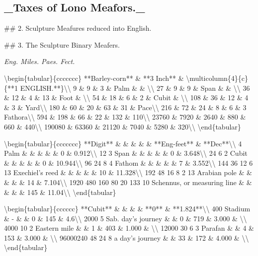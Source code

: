 \subsection*{\_Taxes of Lono Meafors.\_}
\#\# 2. Sculpture Meafures reduced into English.\par\medskip
\#\# 3. The Sculpture Binary Meafers.\par\medskip
{\small\itshape Eng. Miles. Paes. Fect.\par}\medskip
\textbackslash{}begin\{tabular\}\{ccccccc\}
**Barley-corn** \& **3 Inch** \& \textbackslash{}multicolumn\{4\}\{c\}\{**1 ENGLISH.**\}\textbackslash{}\textbackslash{}
9 \& 9 \& 3 \& Palm \& \& \textbackslash{}\textbackslash{}
27 \& 9 \& 9 \& Span \& \& \textbackslash{}\textbackslash{}
36 \& 12 \& 4 \& 13 \& Foot \& \textbackslash{}\textbackslash{}
54 \& 18 \& 6 \& 2 \& Cubit \& \textbackslash{}\textbackslash{}
108 \& 36 \& 12 \& 4 \& 3 \& Yard\textbackslash{}\textbackslash{}
180 \& 60 \& 20 \& 63 \& 31 \& Pace\textbackslash{}\textbackslash{}
216 \& 72 \& 24 \& 8 \& 6 \& 3 Fathora\textbackslash{}\textbackslash{}
594 \& 198 \& 66 \& 22 \& 132 \& 110\textbackslash{}\textbackslash{}
23760 \& 7920 \& 2640 \& 880 \& 660 \& 440\textbackslash{}\textbackslash{}
190080 \& 63360 \& 21120 \& 7040 \& 5280 \& 320\textbackslash{}\textbackslash{}
\textbackslash{}end\{tabular\}\par\medskip
\textbackslash{}begin\{tabular\}\{ccccccc\}
**Digit** \& \& \& \& \& **Eng-feet** \& **Dec**\textbackslash{}\textbackslash{}
4 Palm \& \& \& \& \& 0 \& 0.912\textbackslash{}\textbackslash{}
12 3 Span \& \& \& \& \& 0 \& 3.648\textbackslash{}\textbackslash{}
24 6 2 Cubit \& \& \& \& \& 0 \& 10.944\textbackslash{}\textbackslash{}
96 24 8 4 Fathom \& \& \& \& \& 7 \& 3.552\textbackslash{}\textbackslash{}
144 36 12 6 13 Exechiel's reed \& \& \& \& \& 10 \& 11.328\textbackslash{}\textbackslash{}
192 48 16 8 2 13 Arabian pole \& \& \& \& \& 14 \& 7.104\textbackslash{}\textbackslash{}
1920 480 160 80 20 133 10 Schennus, or measuring line \& \& \& \& \& 145 \& 11.04\textbackslash{}\textbackslash{}
\textbackslash{}end\{tabular\}\par\medskip
\textbackslash{}begin\{tabular\}\{cccccc\}
**Cubit** \& \& \& \& **0** \& **1.824**\textbackslash{}\textbackslash{}
400 Stadium \& - \& \& 0 \& 145 \& 4.6\textbackslash{}\textbackslash{}
2000 5 Sab. day's journey \& \& 0 \& 719 \& 3.000 \& \textbackslash{}\textbackslash{}
4000 10 2 Eastern mile \& \& 1 \& 403 \& 1.000 \& \textbackslash{}\textbackslash{}
12000 30 6 3 Parafan \& \& 4 \& 153 \& 3.000 \& \textbackslash{}\textbackslash{}
96000240 48 24 8 a day's journey \& \& 33 \& 172 \& 4.000 \& \textbackslash{}\textbackslash{}
\textbackslash{}end\{tabular\}\par\medskip
